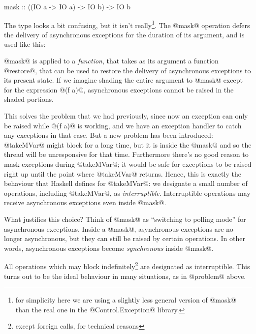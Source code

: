 \begin{haskell}
mask :: ((IO a -> IO a) -> IO b) -> IO b
\end{haskell}

\noindent The type looks a bit confusing, but it isn't
really\footnote{for simplicity here we are using a slightly less
  general version of @mask@ than the real one in the
  @Control.Exception@ library.}.  The @mask@ operation defers the
delivery of asynchronous exceptions for the duration of its argument,
and is used like this:


\noindent @mask@ is applied to a \emph{function}, that takes as its
argument a function @restore@, that can be used to restore the
delivery of asynchronous exceptions to its present state.  If we
imagine shading the entire argument to @mask@ except for the
expression @(f a)@, asynchronous exceptions cannot be raised in the
shaded portions.

This solves the problem that we had previously, since now an exception
can only be raised while @(f a)@ is working, and we have an exception
handler to catch any exceptions in that case.  But a new problem has
been introduced: @takeMVar@ might block for a long time, but it is
inside the @mask@ and so the thread will be unresponsive for that
time.  Furthermore there's no good reason to mask exceptions during
@takeMVar@; it would be safe for exceptions to be raised right up
until the point where @takeMVar@ returns.  Hence, this is exactly the
behaviour that Haskell defines for @takeMVar@: we designate a small
number of operations, including @takeMVar@, as \emph{interruptible}.
Interruptible operations may receive asynchronous exceptions even
inside @mask@.

What justifies this choice?  Think of @mask@ as ``switching to polling
mode'' for asynchronous exceptions.  Inside a @mask@, asynchronous
exceptions are no longer asynchronous, but they can still be raised by
certain operations.  In other words, asynchronous exceptions become
\emph{synchronous} inside @mask@.

All operations which may block indefinitely\footnote{except foreign
  calls, for technical reasons} are designated as interruptible.  This
turns out to be the ideal behaviour in many situations, as in
@problem@ above.

